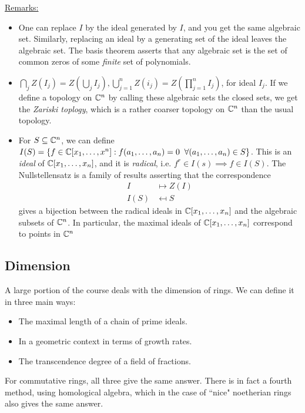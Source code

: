 \documentclass[10pt,a4paper]{article}
\begin{document}
\underline{Remarks:}
\begin{itemize}
\item One can replace $I$ by the ideal generated by $I$, and you get the same algebraic set. Similarly, replacing an ideal by a generating set of the ideal leaves the algebraic set. The basis theorem asserts that any algebraic set is the set of common zeros of some \emph{finite} set of polynomials.

\item $\bigcap_j Z(I_j) = Z(\bigcup_j I_j), \bigcup_{j=1}^n Z(i_j) = Z(\prod_{j=1}^n I_j)$, for ideal $I_j$. If we define a topology on $\mathbb{C}^n$ by calling these algebraic sets the closed sets, we get the \emph{Zariski toplogy}, which is a rather coarser topology on $\mathbb{C}^n$ than the usual topology.

\item For $S \subseteq \mathbb{C}^n$, we can define $I(S) = \{f \in \C[x_1, \ldots, x^n] : f(a_1, \ldots, a_n)=0\;\forall (a_1, \ldots, a_n) \in S\}$. This is an \emph{ideal} of $\mathbb{C}[x_1, \ldots, x_n]$, and it is \emph{radical}, i.e. $f^r \in I(s) \implies f \in I(S)$. The Nullstellensatz is a family of results asserting that the correspondence
\begin{align*}
I &\mapsto Z(I)\\
I(S) &\mapsfrom S
\end{align*}
gives a bijection between the radical ideals in $\mathbb{C}[x_1, \ldots, x_n]$ and the algebraic subsets of $\mathbb{C}^n$. In particular, the maximal ideals of $\mathbb{C}[x_1, \ldots, x_n]$ correspond to points in $\mathbb{C}^n$
\end{itemize}

\subsection*{Dimension}
A large portion of the course deals with the dimension of rings. We can define it in three main ways:
\begin{itemize}
\item The maximal length of a chain of prime ideals.
\item In a geometric context in terms of growth rates.
\item The transcendence degree of a field of fractions.
\end{itemize}
For commutative rings, all three give the same answer. There is in fact a fourth method, using homological algebra, which in the case of ``nice" noetherian rings also gives the same answer.
\end{document}
